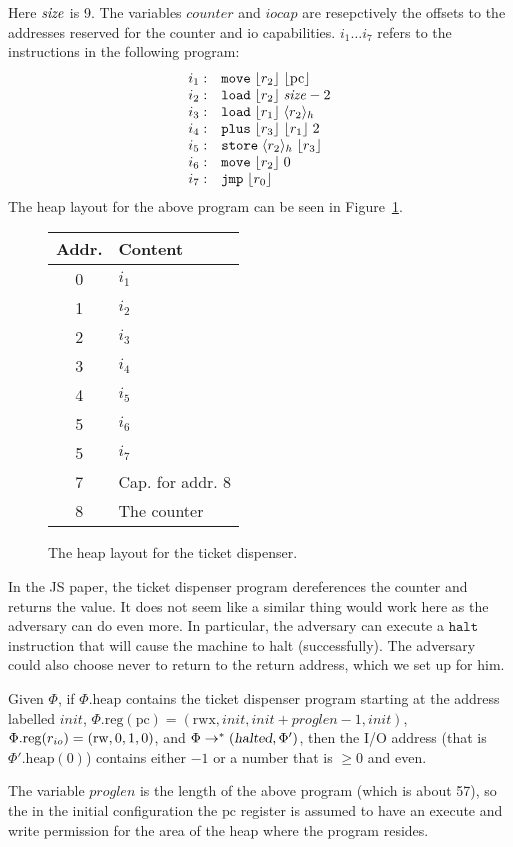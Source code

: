 \documentclass{article}
\newcommand{\var}[1]{\mathit{#1}}
\newcommand{\pcreg}{\mathrm{pc}}
\newcommand{\plainproj}[1]{\mathrm{#1}}
\newcommand{\memheap}[1][\Phi]{#1.\plainproj{heap}}
\newcommand{\memreg}[1][\Phi]{#1.\plainproj{reg}}
\newcommand{\halted}{\textsl{halted}}
\newcommand{\codelabel}[1]{\mathit{#1}}
\newcommand{\init}{\codelabel{init}}
\newcommand{\counter}{\codelabel{counter}}
\newcommand{\iocap}{\codelabel{iocap}}
\newcommand{\refreg}[1]{\lfloor #1 \rfloor}
\newcommand{\refheap}[1]{\langle #1 \rangle_h}
\newcommand{\halt}{\instr{halt}}
\newcommand{\instr}[1]{\mathtt{#1}}
\newcommand{\oneinstr}[2]{\instr{#1} \; #2}
\newcommand{\jmp}[1]{\oneinstr{jmp}{#1}}
\newcommand{\twoinstr}[3]{\instr{#1} \; #2 \; #3}
\newcommand{\move}[2]{\twoinstr{move}{#1}{#2}}
\newcommand{\store}[2]{\twoinstr{store}{#1}{#2}}
\newcommand{\load}[2]{\twoinstr{load}{#1}{#2}}
\newcommand{\threeinstr}[4]{\instr{#1} \; #2 \; #3 \; #4}
\newcommand{\plus}[3]{\threeinstr{plus}{#1}{#2}{#3}}
\newcommand{\plainperm}[1]{\mathrm{#1}}
\newcommand{\readwrite}{\plainperm{rw}}
\newcommand{\rwx}{\plainperm{rwx}}
\begin{document}
Here $\size$ is 9. The variables $\counter$ and $\iocap$ are resepctively the offsets to the addresses reserved for the counter and io capabilities. $i_1 \dots i_7$ refers to the instructions in the following program:
\[
  \begin{array}{r l}
    i_1 :& \move{\refreg{r_2}}{\refreg{\pcreg}} \\
    i_2 :& \load{\refreg{r_2}}{\size - 2} \\
    i_3 :& \load{\refreg{r_1}}{\refheap{r_2}}\\
    i_4 :& \plus{\refreg{r_3}}{\refreg{r_1}}{2} \\
    i_5 :& \store{\refheap{r_2}}{\refreg{r_3}} \\
    i_6 :& \move{\refreg{r_2}}{0} \\
    i_7 :& \jmp{\refreg{r_0}}
  \end{array}
\]
The heap layout for the above program can be seen in Figure~\ref{tab:tick-disp-heap}.
\begin{figure}[ht]
  \centering
  \begin{tabular}{ | c | l | }
    \hline
    Addr. & Content \\ \hline
    0   &  $i_1$ \\ \hline
    1   &  $i_2$ \\ \hline
    2   &  $i_3$ \\ \hline
    3   &  $i_4$ \\ \hline
    4   &  $i_5$ \\ \hline
    5   &  $i_6$ \\ \hline
    5   &  $i_7$ \\ \hline
    7   & Cap. for addr. 8 \\ \hline
    8   & The counter \\ \hline  
  \end{tabular}
  \caption{The heap layout for the ticket dispenser.}
  \label{tab:tick-disp-heap}
\end{figure}
In the JS paper, the ticket dispenser program dereferences the counter and returns the value. It does not seem like a similar thing would work here as the adversary can do even more. In particular, the adversary can execute a $\halt$ instruction that will cause the machine to halt (successfully). The adversary could also choose never to return to the return address, which we set up for him.
\begin{lemma}
 Given $\Phi$, if $\memheap$ contains the ticket dispenser program starting at the address labelled $\init$, $\memreg(\pcreg) = (\rwx,\init,\init+\var{proglen}-1,\init)$, $\memreg(\rio) = (\readwrite,0,1,0)$, and $\Phi \rightarrow^* (\halted,\Phi')$, then the I/O address (that is $\memheap[\Phi'](0)$) contains either $-1$ or a number that is $\geq 0$ and even.
\end{lemma}
The variable $\var{proglen}$ is the length of the above program (which is about 57), so the in the initial configuration the $\pcreg$ register is assumed to have an execute and write permission for the area of the heap where the program resides.
\end{document}
